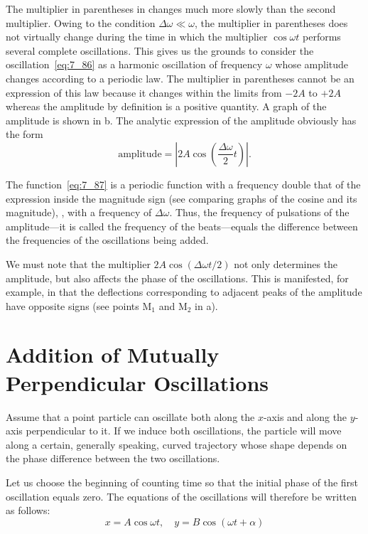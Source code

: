 The multiplier in parentheses in  changes much more slowly than the second multiplier. Owing to the condition $\Delta\omega\ll\omega$, the multiplier in parentheses does not virtually change during the time in which the multiplier $\cos\omega t$ performs several complete oscillations. This gives us the grounds to consider the oscillation~\eqref{eq:7_86} as a harmonic oscillation of frequency $\omega$ whose amplitude changes according to a periodic law. The multiplier in parentheses cannot be an expression of this law because it changes within the limits from $-2A$ to $+2A$ whereas the amplitude by definition is a positive quantity. A graph of the amplitude is shown in b. The analytic expression of the amplitude obviously has the form
\begin{equation}\label{eq:7_87}
	\text{amplitude} = \left|2A\cos\left(\frac{\Delta\omega}{2}t\right)\right|.
\end{equation}

The function~\eqref{eq:7_87} is a periodic function with a frequency double that of the expression inside the magnitude sign (see  comparing graphs of the cosine and its magnitude), \ie, with a frequency of $\Delta\omega$. Thus, the frequency of pulsations of the amplitude---it is called the frequency of the beats---equals the difference between the frequencies of the oscillations being added.

We must note that the multiplier $2A\cos(\Delta\omega t/2)$ not only determines the amplitude, but also affects the phase of the oscillations. This is manifested, for example, in that the deflections corresponding to adjacent peaks of the amplitude have opposite signs (see points M$_1$ and M$_2$ in a).

\section{Addition of Mutually Perpendicular Oscillations}\label{sec:7_9}

Assume that a point particle can oscillate both along the $x$-axis and along the $y$-axis perpendicular to it. If we induce both oscillations, the particle will move along a certain, generally speaking, curved trajectory whose shape depends on the phase difference between the two oscillations.

Let us choose the beginning of counting time so that the initial phase of the first oscillation equals zero. The equations of the oscillations will therefore be written as follows:
\begin{equation}\label{eq:7_88}
	x = A\cos\omega t,\quad y = B\cos(\omega t + \alpha)
\end{equation}

